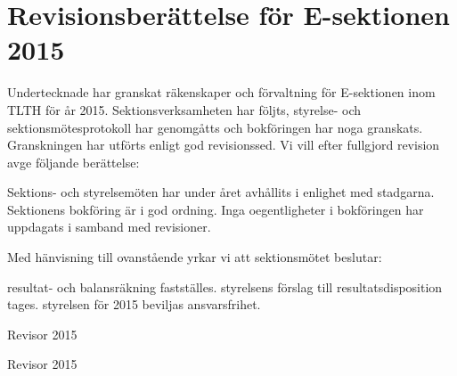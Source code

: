 \documentclass[../_main/handlingar.tex]{subfiles}
\begin{document}
\section{Revisionsberättelse för E-sektionen 2015}
Undertecknade har granskat räkenskaper och förvaltning för E-sektionen inom TLTH för år 2015. Sektionsverksamheten har följts, styrelse- och sektionsmötesprotokoll har genomgåtts och bokföringen har noga granskats. Granskningen har utförts enligt god revisionssed. Vi vill efter fullgjord revision avge följande berättelse:

Sektions- och styrelsemöten har under året avhållits i enlighet med stadgarna. Sektionens bokföring är i god ordning. Inga oegentligheter i bokföringen har uppdagats i samband med revisioner.

Med hänvisning till ovanstående yrkar vi att sektionsmötet beslutar:
\begin{attsatser}
    \att resultat- och balansräkning fastställes.
    \att styrelsens förslag till resultatsdisposition tages.
    \att styrelsen för 2015 beviljas ansvarsfrihet.
\end{attsatser}

\begin{signatures}{2}
    \mvh
    \signature{Sara Gunnarsson}{Revisor 2015}
    \signature{Kajsa Eriksson Rosenqvist}{Revisor 2015}
\end{signatures}
\end{document}
